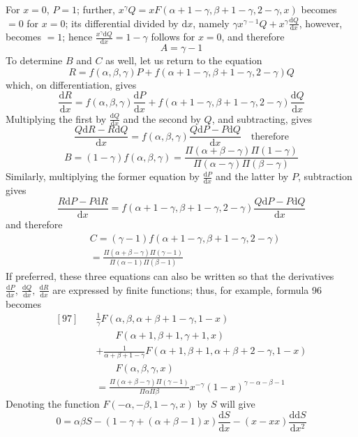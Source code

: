 For \(x=0\), \(P=1\); further, \(x^\gamma Q=xF(\alpha+1-\gamma,\beta+1-\gamma,2-\gamma,x)\) becomes \(=0\) for \(x=0\); its differential divided by \(\mathrm dx\), namely \(\gamma x^{\gamma-1}Q+x^\gamma\frac{\mathrm dQ}{\mathrm dx}\), however, becomes \(=1\); hence \(\frac{x^\gamma\mathrm dQ}{\mathrm dx}=1-\gamma\) follows for \(x=0\), and therefore
\[
A=\gamma-1
\]
To determine \(B\) and \(C\) as well, let us return to the equation
\[
R=f(\alpha,\beta,\gamma)P+f(\alpha+1-\gamma,\beta+1-\gamma,2-\gamma)Q
\]
which, on differentiation, gives
\[
\frac{\mathrm dR}{\mathrm dx}=f(\alpha,\beta,\gamma)\frac{\mathrm dP}{\mathrm dx}+f(\alpha+1-\gamma,\beta+1-\gamma,2-\gamma)\frac{\mathrm dQ}{\mathrm dx}
\]
Multiplying the first by \(\frac{\mathrm dQ}{\mathrm dx}\) and the second by \(Q\), and subtracting, gives
\[
\frac{Q\mathrm dR-R\mathrm dQ}{\mathrm dx}=f(\alpha,\beta,\gamma)\frac{Q\mathrm dP-P\mathrm dQ}{\mathrm dx}\quad\mbox{therefore}
\]
\[
B=(1-\gamma)f(\alpha,\beta,\gamma)=\frac{\Pi(\alpha+\beta-\gamma)\Pi(1-\gamma)}{\Pi(\alpha-\gamma)\Pi(\beta-\gamma)}
\]
Similarly, multiplying the former equation by \(\frac{\mathrm dP}{\mathrm dx}\) and the latter by \(P\), subtraction gives
\[
\frac{R\mathrm dP-P\mathrm dR}{\mathrm dx}=f(\alpha+1-\gamma,\beta+1-\gamma,2-\gamma)\frac{Q\mathrm dP-P\mathrm dQ}{\mathrm dx}
\]
and therefore
\[
\begin{aligned}&C=(\gamma-1)f(\alpha+1-\gamma,\beta+1-\gamma,2-\gamma)\\&=\frac{\Pi(\alpha+\beta-\gamma)\Pi(\gamma-1)}{\Pi(\alpha-1)\Pi(\beta-1)}\end{aligned}
\]
If preferred, these three equations can also be written so that the derivatives \(\frac{\mathrm dP}{\mathrm dx},\ \frac{\mathrm dQ}{\mathrm dx},\ \frac{\mathrm dR}{\mathrm dx}\) are expressed by finite functions; thus, for example, formula 96 becomes
\[
\begin{aligned}
{}[97]\quad&\frac1\gamma F(\alpha,\beta,\alpha+\beta+1-\gamma,1-x)\\&\qquad F(\alpha+1,\beta+1,\gamma+1,x)\\
&+\frac1{\alpha+\beta+1-\gamma}F(\alpha+1,\beta+1,\alpha+\beta+2-\gamma,1-x)\\&\qquad F(\alpha,\beta,\gamma,x)\\
&=\frac{\Pi(\alpha+\beta-\gamma)\Pi(\gamma-1)}{\Pi\alpha\Pi\beta}x^{-\gamma}(1-x)^{\gamma-\alpha-\beta-1}
\end{aligned}
\]
Denoting the function $F(-\alpha,-\beta,1-\gamma,x)$ by $S$ will give
\[
0=\alpha\beta S-(1-\gamma+(\alpha+\beta-1)x)\frac{\mathrm dS}{\mathrm dx}-(x-xx)\frac{\mathrm{dd}S}{\mathrm dx^2}
\]
